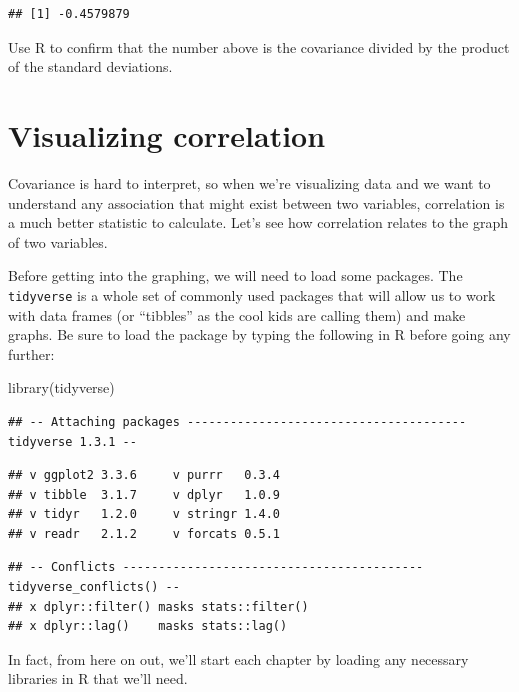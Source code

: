 \documentclass[
]{book}
\newenvironment{Shaded}{\begin{snugshade}}{\end{snugshade}}
\newcommand{\FunctionTok}[1]{\textcolor[rgb]{0.00,0.00,0.00}{#1}}
\newcommand{\NormalTok}[1]{#1}
\begin{document}
\begin{verbatim}
## [1] -0.4579879
\end{verbatim}

Use R to confirm that the number above is the covariance divided by the product of the standard deviations.

\hypertarget{covariance-visualizing}{%
\section{Visualizing correlation}\label{covariance-visualizing}}

Covariance is hard to interpret, so when we're visualizing data and we want to understand any association that might exist between two variables, correlation is a much better statistic to calculate. Let's see how correlation relates to the graph of two variables.

Before getting into the graphing, we will need to load some packages. The \texttt{tidyverse} is a whole set of commonly used packages that will allow us to work with data frames (or ``tibbles'' as the cool kids are calling them) and make graphs. Be sure to load the package by typing the following in R before going any further:

\begin{Shaded}
\begin{Highlighting}[]
\FunctionTok{library}\NormalTok{(tidyverse)}
\end{Highlighting}
\end{Shaded}

\begin{verbatim}
## -- Attaching packages --------------------------------------- tidyverse 1.3.1 --
\end{verbatim}

\begin{verbatim}
## v ggplot2 3.3.6     v purrr   0.3.4
## v tibble  3.1.7     v dplyr   1.0.9
## v tidyr   1.2.0     v stringr 1.4.0
## v readr   2.1.2     v forcats 0.5.1
\end{verbatim}

\begin{verbatim}
## -- Conflicts ------------------------------------------ tidyverse_conflicts() --
## x dplyr::filter() masks stats::filter()
## x dplyr::lag()    masks stats::lag()
\end{verbatim}

In fact, from here on out, we'll start each chapter by loading any necessary libraries in R that we'll need.
\end{document}
